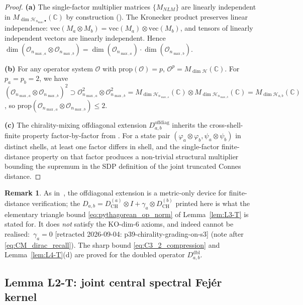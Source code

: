 \documentclass[11pt,a4paper]{article}
\theoremstyle{plain}
\theoremstyle{definition}
\newtheorem{remark}[theorem]{Remark}
\newcommand{\nmax}{n_{\max}}
\newcommand{\nmaxa}{n_{\max,a}}
\newcommand{\nmaxb}{n_{\max,b}}
\newcommand{\Hilb}{\mathcal{H}}
\newcommand{\Op}{\mathcal{O}}
\newcommand{\C}{\mathbb{C}}
\newcommand{\Mat}{M}
\newcommand{\DCH}{D_{\mathrm{CH}}}
\begin{document}
\begin{proof}
\textbf{(a)} The single-factor multiplier matrices $\{\Mat_{NLM}\}$
are linearly independent in $M_{\dim \Hilb_{\nmax,\bullet}}(\C)$ by
construction (\cite[\S 3.1]{loutey_paper38}). The Kronecker product
preserves linear independence: $\mathrm{vec}(\Mat_a \otimes \Mat_b)
= \mathrm{vec}(\Mat_a) \otimes \mathrm{vec}(\Mat_b)$, and tensors of
linearly independent vectors are linearly independent. Hence
$\dim(\Op_{\nmaxa} \otimes \Op_{\nmaxb}) = \dim(\Op_{\nmaxa}) \cdot
\dim(\Op_{\nmaxb})$.

\textbf{(b)} For any operator system $\Op$ with $\mathrm{prop}(\Op) =
p$, $\Op^p = M_{\dim \Hilb}(\C)$. For $p_a = p_b = 2$, we have
$(\Op_{\nmaxa} \otimes \Op_{\nmaxb})^2 \supset \Op_{\nmaxa}^2 \otimes
\Op_{\nmaxb}^2 = M_{\dim \Hilb_{\nmaxa}}(\C) \otimes M_{\dim
\Hilb_{\nmaxb}}(\C) = M_{\dim \Hilb_{a,b}}(\C)$, so
$\mathrm{prop}(\Op_{\nmaxa} \otimes \Op_{\nmaxb}) \le 2$.

\textbf{(c)} The chirality-mixing offdiagonal extension
$D_{a,b}^{\mathrm{offdiag}}$ inherits the cross-shell-finite property
factor-by-factor from \cite[Lemma~3.1]{loutey_paper38}. For a state
pair $(\varphi_a \otimes \varphi_b, \psi_a \otimes \psi_b)$ in
distinct shells, at least one factor differs in shell, and the
single-factor finite-distance property on that factor produces a
non-trivial structural multiplier bounding the supremum
in the SDP definition of the joint truncated Connes distance.
\end{proof}

\begin{remark}\label{rem:offdiag-T}
As in~\cite[Remark~3.2]{loutey_paper38}, the offdiagonal extension is a
metric-only device for finite-distance verification; the
$D_{a,b} = \DCH^{(a)} \otimes I + \gamma_a \otimes \DCH^{(b)}$ printed here
is what the elementary triangle bound \eqref{eq:pythagorean_op_norm} of
Lemma~\ref{lem:L3-T} is stated for. It does
\emph{not} satisfy the KO-dim-6 axioms, and indeed cannot be realised:\
$\gamma_a = 0$ [retracted 2026-09-04: p39-chirality-grading-on-s3] (note after
\eqref{eq:CM_dirac_recall}). The sharp bound \eqref{eq:C3_2_compression} and
Lemma~\ref{lem:L4-T}(d) are proved for the doubled operator
$D^{\mathrm{dbl}}_{a,b}$.
\end{remark}

\subsection{Lemma L2-T: joint central spectral Fej\'er kernel}
\label{sec:L2-T}
\end{document}

